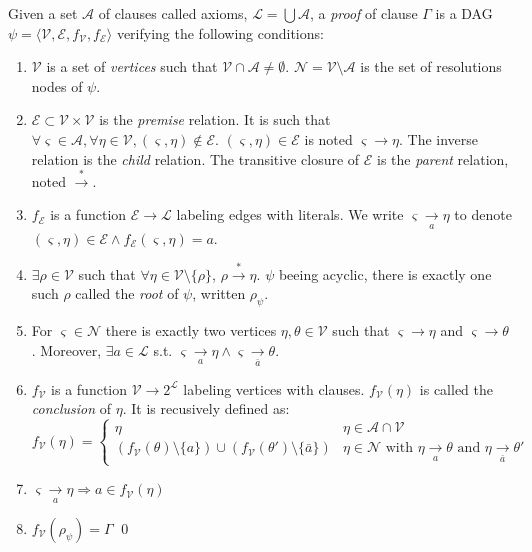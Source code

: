 \documentclass{llncs}
\newcommand{\dual}[1]{\ensuremath{\bar{#1}}}
\begin{document}
\begin{definition}[Proof] \label{def:proof}
Given a set $\mathcal{A}$ of clauses called axioms, $\mathcal{L} = \bigcup{\mathcal{A}}$, a
\emph{proof} of clause $\Gamma$ is a DAG $\psi = \langle \mathcal{V}, \mathcal{E}, f_\mathcal{V},
f_\mathcal{E} \rangle$ verifying the following conditions:
\begin{enumerate}[nosep]
  \item $\mathcal{V}$ is a set of \emph{vertices} such that
    $\mathcal{V} \cap \mathcal{A} \neq \emptyset$.
    $\mathcal{N} = \mathcal{V} \setminus \mathcal{A}$ is the set of resolutions nodes of $\psi$.
  \item $\mathcal{E} \subset \mathcal{V} \times \mathcal{V}$ is the \emph{premise} relation.
    It is such that $\forall \varsigma \in \mathcal{A}, \forall \eta \in \mathcal{V}, (\varsigma,
    \eta) \notin \mathcal{E}$. $(\varsigma, \eta) \in \mathcal{E}$ is noted $\varsigma \rightarrow
    \eta$. The inverse relation is the \emph{child} relation. The transitive closure of
    $\mathcal{E}$ is the \emph{parent} relation, noted $\xrightarrow{*}$.
  \item $f_\mathcal{E}$ is a function $\mathcal{E} \longrightarrow \mathcal{L}$ labeling edges with
    literals. We write $\varsigma \xrightarrow[a]{} \eta$ to denote
    $(\varsigma, \eta) \in \mathcal{E} \wedge f_\mathcal{E}(\varsigma, \eta) = a$.
  \item $\exists \rho \in \mathcal{V}$ such that $\forall \eta \in \mathcal{V} \setminus \{\rho\}$,
    $\rho \xrightarrow{*} \eta$. $\psi$ beeing acyclic, there is exactly one such $\rho$ called the
    \emph{root} of $\psi$, written $\rho_\psi$.
  \item For $\varsigma \in \mathcal{N}$ there is exactly two vertices $\eta, \theta \in \mathcal{V}$
    such that $\varsigma \rightarrow \eta$ and $\varsigma \rightarrow \theta$. Moreover,
    $\exists a \in \mathcal{L}$ s.t. $\varsigma \xrightarrow[a]{} \eta \wedge \varsigma
    \xrightarrow[\dual{a}]{} \theta$.
  \item $f_\mathcal{V}$ is a function $\mathcal{V} \longrightarrow 2^\mathcal{L}$ labeling vertices
    with clauses. $f_\mathcal{V}(\eta)$ is called the \emph{conclusion} of $\eta$. It is recusively
    defined as:
    \begin{equation*}
      f_\mathcal{V}(\eta) = \begin{cases}
        \eta & \eta \in \mathcal{A} \cap \mathcal{V} \\
        \left(f_\mathcal{V}(\theta) \setminus \{a\}\right) \cup
        \left(f_\mathcal{V}(\theta') \setminus \{\dual{a}\}\right) &
              \eta \in \mathcal{N} \text{ with } \eta \xrightarrow[a]{} \theta \text{ and }
                                               \eta \xrightarrow[\dual{a}]{} \theta'
      \end{cases}
    \end{equation*}
  \item $\varsigma \xrightarrow[a]{} \eta \Rightarrow a \in f_\mathcal{V}(\eta)$
  \item $f_\mathcal{V}(\rho_\psi) = \Gamma$
  \qed
\end{enumerate}
\end{definition}
\end{document}
